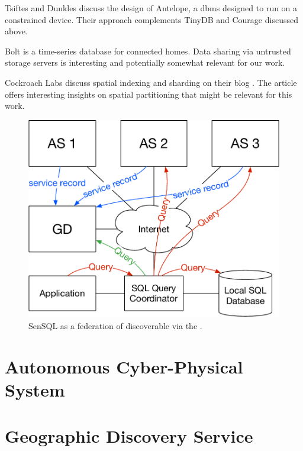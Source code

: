 \documentclass[conference,10pt]{IEEEtran}
\begin{document}
Tsiftes and Dunkles \cite{tsiftes11:sensordb} discuss the design of Antelope, a \gls{dbms} designed to run on a constrained device. Their approach complements TinyDB and Courage discussed above.

Bolt \cite{gupta14:bolt} is a time-series database for connected homes. Data sharing via untrusted storage servers is interesting and potentially somewhat relevant for our work.

Cockroach Labs discuss spatial indexing and sharding on their blog \cite{cockroach-spatial-indexing}. The article offers interesting insights on spatial partitioning that might be relevant for this work.

\nocite{pavlo2016s}

\begin{figure}
  \centering
  \includegraphics[width=0.7\linewidth]{figs/conceptual-diagram.pdf}%
  \caption{SenSQL as a federation of  discoverable via the .}\label{fig:conceptual-diagram}
\end{figure}

\section{Autonomous Cyber-Physical System}\label{sec:autonomous-cyber-physical-system}


\section{Geographic Discovery Service}\label{sec:geographic-discovery-service}

\end{document}
